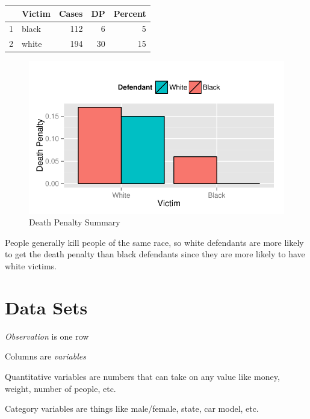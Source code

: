 \documentclass[letterpaper, landscape]{article}
\begin{document}
  \begin{table}[H]
    \centering
    \begin{tabular}{rlrrr}
      \toprule
        & Victim & Cases & DP & Percent \\
      \midrule
      1 & black  & 112   & 6  & 5 \\
      2 & white  & 194   & 30 & 15 \\
      \bottomrule
    \end{tabular}
  \end{table}

  \begin{figure}[H]
    \centering
    \includegraphics[scale = 0.8]{figures/death_penalty.pdf}
    \caption{Death Penalty Summary}
  \end{figure}

  People generally kill people of the same race, so white defendants are more likely to get the
  death penalty than black defendants since they are more likely to have white victims.

  \section{Data Sets}
  \begin{itemize*}
    \item {\em Observation\/} is one row
    \item Columns are {\em variables\/}
    \item Quantitative variables are numbers that can take on any value like money, weight, number
      of people, etc.
    \item Category variables are things like male/female, state, car model, etc.
  \end{itemize*}
\end{document}
